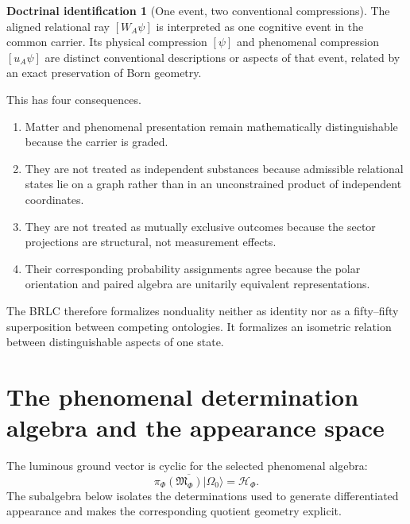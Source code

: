 \documentclass[11pt,reqno]{scrartcl}
\newcommand{\scrHF}{\mathscr H_{\Phi}}
\newcommand{\algF}{\mathfrak M_{\Phi}}
\newcommand{\piF}{\pi_{\Phi}}
\newcommand{\polA}{u_A}
\newcommand{\ket}[1]{\lvert #1\rangle}
\newcommand{\WA}{W_{A}}
\theoremstyle{plain}
\theoremstyle{definition}
\newtheorem{identification}[identification]{Doctrinal identification}
\theoremstyle{remark}
\begin{document}
\begin{identification}[One event, two conventional compressions]
\label{id:one-event-two-compressions}
The aligned relational ray \([\WA\psi]\) is interpreted as one cognitive
event in the common carrier.  Its physical compression \([\psi]\) and
phenomenal compression \([\polA\psi]\) are distinct conventional
descriptions or aspects of that event, related by an exact preservation of
Born geometry.
\end{identification}

This has four consequences.
\begin{enumerate}[label=(\roman*)]
  \item Matter and phenomenal presentation remain mathematically
  distinguishable because the carrier is graded.
  \item They are not treated as independent substances because admissible
  relational states lie on a graph rather than in an unconstrained product
  of independent coordinates.
  \item They are not treated as mutually exclusive outcomes because the
  sector projections are structural, not measurement effects.
  \item Their corresponding probability assignments agree because the polar
  orientation and paired algebra are unitarily equivalent representations.
\end{enumerate}

The BRLC therefore formalizes nonduality neither as identity nor as a
fifty--fifty superposition between competing ontologies.  It formalizes an
isometric relation between distinguishable aspects of one state.
\section{The phenomenal determination algebra and the appearance space}
\label{sec:phenomenal-determination-gns}

The luminous ground vector is cyclic for the selected phenomenal algebra:
\begin{equation}
  \overline{\piF(\algF)\ket{\Omega_0}}=\scrHF.
  \label{eq:full-phenomenal-cyclicity}
\end{equation}
The subalgebra below isolates the determinations used to generate
differentiated appearance and makes the corresponding quotient geometry
explicit.
\end{document}
